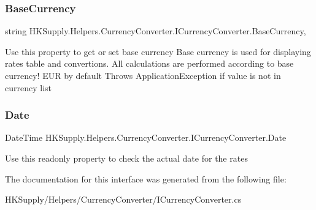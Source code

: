 \subsubsection{\texorpdfstring{Base\+Currency}{BaseCurrency}}
{\footnotesize\ttfamily string H\+K\+Supply.\+Helpers.\+Currency\+Converter.\+I\+Currency\+Converter.\+Base\+Currency\hspace{0.3cm}{\ttfamily [get]}, {\ttfamily [set]}}



Use this property to get or set base currency Base currency is used for displaying rates table and convertions. All calculations are performed according to base currency! E\+UR by default Throws Application\+Exception if value is not in currency list 

\mbox{\label{interface_h_k_supply_1_1_helpers_1_1_currency_converter_1_1_i_currency_converter_ab0194cbb76f7209c2b23ee923cade86f}} 
\subsubsection{\texorpdfstring{Date}{Date}}
{\footnotesize\ttfamily Date\+Time H\+K\+Supply.\+Helpers.\+Currency\+Converter.\+I\+Currency\+Converter.\+Date\hspace{0.3cm}{\ttfamily [get]}}



Use this readonly property to check the actual date for the rates 



The documentation for this interface was generated from the following file\+:\begin{DoxyCompactItemize}
\item 
H\+K\+Supply/\+Helpers/\+Currency\+Converter/I\+Currency\+Converter.\+cs\end{DoxyCompactItemize}
